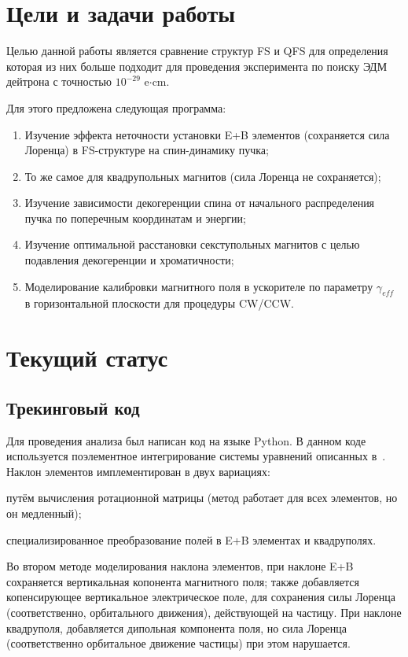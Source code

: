 \documentclass{article}
\begin{document}
	\section{Цели и задачи работы}
	Целью данной работы является сравнение структур FS и QFS для определения которая из них больше подходит для проведения эксперимента по поиску ЭДМ дейтрона с точностью $10^{-29}$ e$\cdot$cm.
	
	Для этого предложена следующая программа:
	\begin{enumerate}
		\item Изучение эффекта неточности установки E+B элементов (сохраняется сила Лоренца) в FS-структуре на спин-динамику пучка;
		\item То же самое для квадрупольных магнитов (сила Лоренца не сохраняется);
		\item Изучение зависимости декогеренции спина от начального распределения пучка по поперечным координатам и энергии;
		\item Изучение оптимальной расстановки секступольных магнитов с целью подавления декогеренции и хроматичности;
		\item Моделирование калибровки магнитного поля в ускорителе по параметру $\gamma_{eff}$ в горизонтальной плоскости для процедуры CW/CCW.
	\end{enumerate}

	\section{Текущий статус}
	\subsection{Трекинговый код}
	Для проведения анализа был написан код на языке Python. В данном коде используется поэлементное интегрирование системы уравнений описанных в~\cite[стр. 39]{Ivanov_thesis}. Наклон элементов имплементирован в двух вариациях:
	\begin{inparaenum}[1)]
		\item путём вычисления ротационной матрицы (метод работает для всех элементов, но он медленный);
		\item специализированное преобразование полей в E+B элементах и квадруполях.
	\end{inparaenum}
	Во втором методе моделирования наклона элементов, при наклоне E+B сохраняется вертикальная копонента магнитного поля; также добавляется копенсирующее вертикальное электрическое поле, для сохранения силы Лоренца (соответственно, орбитального движения), действующей на частицу. При наклоне квадруполя, добавляется дипольная компонента поля, но сила Лоренца (соответственно орбитальное движение частицы) при этом нарушается.
	
\end{document}
